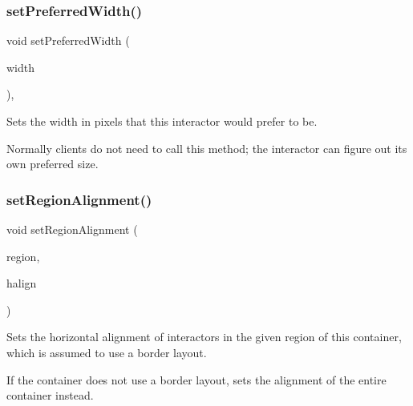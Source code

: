 \subsubsection{\texorpdfstring{set\+Preferred\+Width()}{setPreferredWidth()}}
{\footnotesize\ttfamily void set\+Preferred\+Width (\begin{DoxyParamCaption}\item[{double}]{width }\end{DoxyParamCaption})\hspace{0.3cm}{\ttfamily [virtual]}, {\ttfamily [inherited]}}



Sets the width in pixels that this interactor would prefer to be. 

Normally clients do not need to call this method; the interactor can figure out its own preferred size. \mbox{\label{classGContainer_a96e9f5593c0193bbdc7ae99945b9cf5f}} 
\subsubsection{\texorpdfstring{set\+Region\+Alignment()}{setRegionAlignment()}\hspace{0.1cm}{\footnotesize\ttfamily [1/5]}}
{\footnotesize\ttfamily void set\+Region\+Alignment (\begin{DoxyParamCaption}\item[{\mbox{\hyperlink{classGContainer_a81a01a86de31071a92e6cce0bab9bc4b}{Region}}}]{region,  }\item[{Horizontal\+Alignment}]{halign }\end{DoxyParamCaption})\hspace{0.3cm}{\ttfamily [virtual]}}



Sets the horizontal alignment of interactors in the given region of this container, which is assumed to use a border layout. 

If the container does not use a border layout, sets the alignment of the entire container instead. \mbox{\label{classGContainer_a926942899d029fc9921fe770ac2867bb}} 
